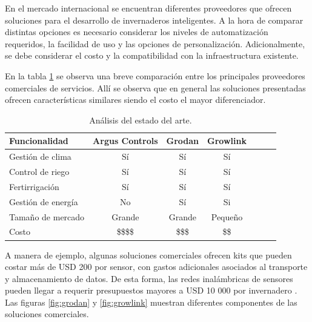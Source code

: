 



En el mercado internacional se encuentran diferentes proveedores que ofrecen soluciones para el desarrollo de invernaderos inteligentes. A la hora de comparar distintas opciones es necesario considerar los niveles de automatización requeridos, la facilidad de uso y las opciones de personalización. Adicionalmente, se debe considerar el costo y la compatibilidad con la infraestructura existente. 

En la tabla \ref{tab:vendors} se observa una breve comparación entre los principales proveedores comerciales de servicios. Allí se observa que en general las soluciones presentadas ofrecen características similares siendo el costo el mayor diferenciador.



\begin{table}[h]
\centering
\caption[Análisis del estado del arte]{Análisis del estado del arte.}

\begin{tabular}{lcccccc} 
\toprule
\textbf{Funcionalidad} & \textbf{Argus Controls \citep{arguscontrol}} &\textbf{Grodan \citep{grodan}} & \textbf{Growlink \citep{growlink}}\\

\midrule
Gestión de clima    & Sí & Sí & Sí \\
Control de riego    & Sí & Sí & Sí \\
Fertirrigación      & Sí & Sí & Sí \\
Gestión de energía  & No & Sí & Si \\
Tamaño de mercado   & Grande & Grande & Pequeño \\
Costo               &  \$\$\$\$ & \$\$\$ &  \$\$ \\
\bottomrule
\hline
\end{tabular}
\label{tab:vendors}
\end{table}

A manera de ejemplo, algunas soluciones comerciales ofrecen kits que pueden costar más de USD 200 por sensor, con gastos adicionales asociados al transporte y almacenamiento de datos. De esta forma, las redes inalámbricas de sensores pueden llegar a requerir presupuestos mayores a USD 10 000 por invernadero \citep{digger:1}. Las figuras \ref{fig:grodan} y \ref{fig:growlink} muestran diferentes componentes de las soluciones comerciales. 

